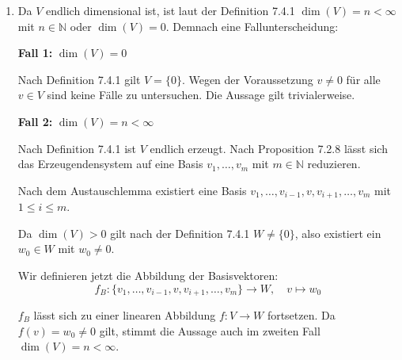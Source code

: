 \documentclass[a4paper,12pt]{article}
\begin{document}
\begin{enumerate}[label=\alph*)]
    \item
    Da $V$ endlich dimensional ist, ist laut der Definition 7.4.1 $\dim(V) = n < \infty$ mit $n \in \mathbb{N}$ oder $\dim(V) = 0$. Demnach eine Fallunterscheidung:

    \medskip
    \textbf{Fall 1:} $\dim(V) = 0$

    Nach Definition 7.4.1 gilt $V = \{0\}$. Wegen der Voraussetzung $v \neq 0$ für alle $v \in V$ sind keine Fälle zu untersuchen. Die Aussage gilt trivialerweise.

    \medskip
    \textbf{Fall 2:} $\dim(V) = n < \infty$

    Nach Definition 7.4.1 ist $V$ endlich erzeugt. Nach Proposition 7.2.8 lässt sich das Erzeugendensystem auf eine Basis $v_1, \ldots, v_m$ mit $m \in \mathbb{N}$ reduzieren.

    Nach dem Austauschlemma existiert eine Basis $v_1, \ldots, v_{i-1}, v, v_{i+1}, \ldots, v_m$ mit $1 \leq i \leq m$.

    Da $\dim(V) > 0$ gilt nach der Definition 7.4.1 $W \neq \{0\}$, also existiert ein $w_0 \in W$ mit $w_0 \neq 0$.

    Wir definieren jetzt die Abbildung der Basisvektoren:
    \[
        f_B \colon \{v_1, \ldots, v_{i-1}, v, v_{i+1}, \ldots, v_m\} \to W, \quad
        v \mapsto w_0
    \]

    $f_B$ lässt sich zu einer linearen Abbildung $f: V \to W$ fortsetzen. Da $f(v) = w_0 \neq 0$ gilt, stimmt die Aussage auch im zweiten Fall $\dim(V) = n < \infty$.

\end{enumerate}
\end{document}
